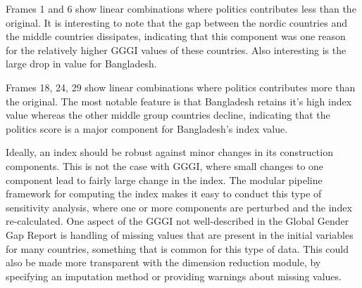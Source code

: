 \documentclass[
]{interact}
\begin{document}
Frames 1 and 6 show linear combinations where politics contributes less
than the original. It is interesting to note that the gap between the
nordic countries and the middle countries dissipates, indicating that
this component was one reason for the relatively higher GGGI values of
these countries. Also interesting is the large drop in value for
Bangladesh.

Frames 18, 24, 29 show linear combinations where politics contributes
more than the original. The most notable feature is that Bangladesh
retains it's high index value whereas the other middle group countries
decline, indicating that the politics score is a major component for
Bangladesh's index value.

Ideally, an index should be robust against minor changes in its
construction components. This is not the case with GGGI, where small
changes to one component lead to fairly large change in the index. The
modular pipeline framework for computing the index makes it easy to
conduct this type of sensitivity analysis, where one or more components
are perturbed and the index re-calculated. One aspect of the GGGI not
well-described in the Global Gender Gap Report is handling of missing
values that are present in the initial variables for many countries,
something that is common for this type of data. This could also be made
more transparent with the dimension reduction module, by specifying an
imputation method or providing warnings about missing values.
\end{document}
